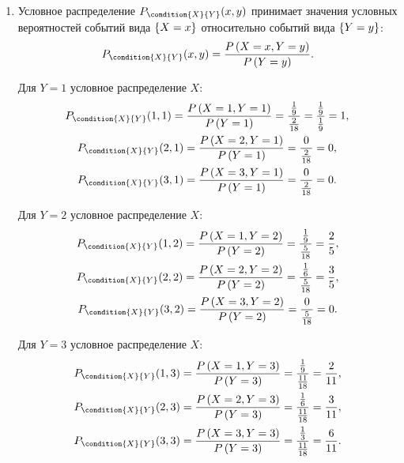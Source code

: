 \documentclass[12pt,a4paper]{article}
\begin{document}
\begin{enumerate}
        \item Условное распределение $P_{\condition{X}{Y}}(x,y)$ принимает значения условных вероятностей событий вида $\left \{ X=x \right \}$ относительно событий вида $\left \{ Y=y \right \}$:
        \begin{equation}
            P_{\condition{X}{Y}}(x,y) = \frac{\probability{X=x, Y=y}}{\probability{Y=y}} .
        \end{equation}

        Для $Y=1$ условное распределение $X$:
        \begin{gather}
            P_{\condition{X}{Y}}(1,1)
            = \frac{\probability{X=1, Y=1}}{\probability{Y=1}}
            = \frac{\frac{1}{9}}{\frac{2}{18}}
            = \frac{\frac{1}{9}}{\frac{1}{9}}
            = 1 , \\
            P_{\condition{X}{Y}}(2,1)
            = \frac{\probability{X=2, Y=1}}{\probability{Y=1}}
            = \frac{0}{\frac{2}{18}}
            = 0 , \\
            P_{\condition{X}{Y}}(3,1)
            = \frac{\probability{X=3, Y=1}}{\probability{Y=1}}
            = \frac{0}{\frac{2}{18}}
            = 0 .
        \end{gather}

        Для $Y=2$ условное распределение $X$:
        \begin{gather}
            P_{\condition{X}{Y}}(1,2)
            = \frac{\probability{X=1, Y=2}}{\probability{Y=2}}
            = \frac{\frac{1}{9}}{\frac{5}{18}}
            = \frac{2}{5} , \\
            P_{\condition{X}{Y}}(2,2)
            = \frac{\probability{X=2, Y=2}}{\probability{Y=2}}
            = \frac{\frac{1}{6}}{\frac{5}{18}}
            = \frac{3}{5} , \\
            P_{\condition{X}{Y}}(3,2)
            = \frac{\probability{X=3, Y=2}}{\probability{Y=2}}
            = \frac{0}{\frac{5}{18}}
            = 0 .
        \end{gather}

        Для $Y=3$ условное распределение $X$:
        \begin{gather}
            P_{\condition{X}{Y}}(1,3)
            = \frac{\probability{X=1, Y=3}}{\probability{Y=3}}
            = \frac{\frac{1}{9}}{\frac{11}{18}}
            = \frac{2}{11} , \\
            P_{\condition{X}{Y}}(2,3)
            = \frac{\probability{X=2, Y=3}}{\probability{Y=3}}
            = \frac{\frac{1}{6}}{\frac{11}{18}}
            = \frac{3}{11} , \\
            P_{\condition{X}{Y}}(3,3)
            = \frac{\probability{X=3,Y=3}}{\probability{Y=3}}
            = \frac{\frac{1}{3}}{\frac{11}{18}}
            = \frac{6}{11} .
        \end{gather}


\end{enumerate}
\end{document}
